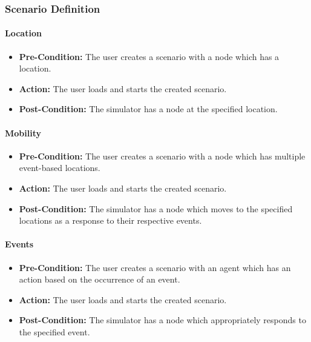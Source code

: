 \documentclass[titlepage]{article}
\newcommand{\testentry}[4]{
    \paragraph{#1}
    \begin{itemize}
        \item \textbf{Pre-Condition:} #2
        \item \textbf{Action:} #3
        \item \textbf{Post-Condition:} #4
    \end{itemize}
}
\begin{document}

\subsubsection{Scenario Definition}
    \testentry{Location}{
        The user creates a scenario with a node which has a location.
    }{
        The user loads and starts the created scenario.
    }{
        The simulator has a node at the specified location.
    }
    \testentry{Mobility}{
        The user creates a scenario with a node which has multiple event-based locations.
    }{
        The user loads and starts the created scenario.
    }{
        The simulator has a node which moves to the specified locations as a response to their respective events.
    }
    \testentry{Events}{
        The user creates a scenario with an agent which has an action based on the occurrence of an event.
    }{
        The user loads and starts the created scenario.
    }{
        The simulator has a node which appropriately responds to the specified event.
    }

\end{document}
